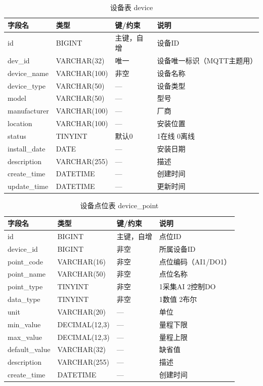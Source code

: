 \documentclass[12pt,hyperref,a4paper,UTF8]{ctexart}
\begin{document}
\begin{table}[!htbp]
    \centering
    \caption{设备表 device}
    \begin{tabularx}{0.90\textwidth}{@{}L{3.0cm} L{3.2cm} L{2.5cm} Y@{}}
    \toprule
    \textbf{字段名} & \textbf{类型} & \textbf{键/约束} & \textbf{说明} \\
    \midrule
    id & BIGINT & 主键，自增 & 设备ID \\
    dev\_id & VARCHAR(32) & 唯一 & 设备唯一标识（MQTT主题用） \\
    device\_name & VARCHAR(100) & 非空 & 设备名称 \\
    device\_type & VARCHAR(50) & — & 设备类型 \\
    model & VARCHAR(50) & — & 型号 \\
    manufacturer & VARCHAR(100) & — & 厂商 \\
    location & VARCHAR(100) & — & 安装位置 \\
    status & TINYINT & 默认0 & 1在线 0离线 \\
    install\_date & DATE & — & 安装日期 \\
    description & VARCHAR(255) & — & 描述 \\
    create\_time & DATETIME & — & 创建时间 \\
    update\_time & DATETIME & — & 更新时间 \\
    \bottomrule
    \end{tabularx}
\end{table}

\begin{table}[!htbp]
    \centering
    \caption{设备点位表 device\_point}
    \begin{tabularx}{0.90\textwidth}{@{}L{3.0cm} L{3.2cm} L{2.5cm} Y@{}}
    \toprule
    \textbf{字段名} & \textbf{类型} & \textbf{键/约束} & \textbf{说明} \\
    \midrule
    id & BIGINT & 主键，自增 & 点位ID \\
    device\_id & BIGINT & 非空 & 所属设备ID \\
    point\_code & VARCHAR(16) & 非空 & 点位编码（AI1/DO1） \\
    point\_name & VARCHAR(50) & 非空 & 点位名称 \\
    point\_type & TINYINT & 非空 & 1采集AI 2控制DO \\
    data\_type & TINYINT & 非空 & 1数值 2布尔 \\
    unit & VARCHAR(20) & — & 单位 \\
    min\_value & DECIMAL(12,3) & — & 量程下限 \\
    max\_value & DECIMAL(12,3) & — & 量程上限 \\
    default\_value & VARCHAR(32) & — & 缺省值 \\
    description & VARCHAR(255) & — & 描述 \\
    create\_time & DATETIME & — & 创建时间 \\
    \bottomrule
    \end{tabularx}
\end{table}
\end{document}
